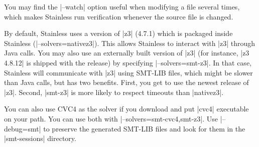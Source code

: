 You may find the |--watch| option useful when modifying a file several times, which makes Stainless
run verification whenever the source file is changed.

By default, Stainless uses a version of |z3| (4.7.1) which is packaged inside Stainless (|--solvers=nativez3|). This allows
Stainless to interact with |z3| through Java calls. You may also use an externally built version of
|z3| (for instance, |z3 4.8.12| is shipped with the release) by specifying |--solvers=smt-z3|.
In that case, Stainless will communicate with |z3| using SMT-LIB files, which might be slower than
Java calls, but has two benefits. First, you get to use the newest release of |z3|. Second,
|smt-z3| is more likely to respect timeouts than |nativez3|.

You can also use CVC4 as the solver if you download and put |cvc4| executable on your path.
You can use both with |--solvers=smt-cvc4,smt-z3|. Use |--debug=smt| to preserve the
generated SMT-LIB files and look for them in the |smt-sessions| directory.
